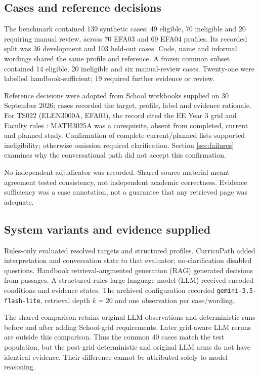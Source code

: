 \subsection{Cases and reference decisions}
The benchmark contained 139 synthetic cases: 49 eligible, 70 ineligible and 20 requiring manual review, across 70 EFA03 and 69 EFA04 profiles. Its recorded split was 36 development and 103 held-out cases. Code, name and informal wordings shared the same profile and reference. A frozen common subset contained 14 eligible, 20 ineligible and six manual-review cases. Twenty-one were labelled handbook-sufficient; 19 required further evidence or review.

Reference decisions were adopted from School workbooks supplied on 30 September 2026; cases recorded the target, profile, label and evidence rationale. For TS022 (ELEN3000A, EFA03), the record cited the EE Year 3 grid and Faculty rules \cite[p.81]{wits}: MATH3025A was a corequisite, absent from completed, current and planned study. Confirmation of complete current/planned lists supported ineligibility; otherwise omission required clarification. Section \ref{sec:failures} examines why the conversational path did not accept this confirmation.

No independent adjudicator was recorded. Shared source material meant agreement tested consistency, not independent academic correctness. Evidence sufficiency was a case annotation, not a guarantee that any retrieved page was adequate.

\subsection{System variants and evidence supplied}
Rules-only evaluated resolved targets and structured profiles. CurricuPath added interpretation and conversation state to that evaluator; no-clarification disabled questions. Handbook retrieval-augmented generation (RAG) generated decisions from passages. A structured-rules large language model (LLM) received encoded conditions and evidence states. The archived configuration recorded \texttt{gemini-3.5-flash-lite}, retrieval depth $k=20$ and one observation per case/wording.

The shared comparison retains original LLM observations and deterministic runs before and after adding School-grid requirements. Later grid-aware LLM reruns are outside this comparison. Thus the common 40 cases match the test population, but the post-grid deterministic and original LLM arms do not have identical evidence. Their difference cannot be attributed solely to model reasoning.

